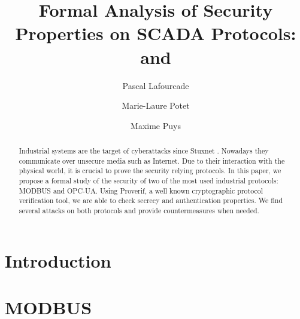\documentclass[a4paper, twocolumn]{article}
\title{Formal Analysis of Security Properties on SCADA Protocols: \opcua and \modbus}
\author{Pascal Lafourcade \and Marie-Laure Potet \and Maxime Puys}
\date{}
\newcommand{\opcua}{OPC-UA\xspace}
\newcommand{\modbus}{MODBUS\xspace}
\begin{document}
\maketitle

\begin{abstract}
    Industrial systems are the target of cyberattacks since Stuxnet
    \cite{Lan11}.  Nowadays they communicate over unsecure media such
    as Internet.  Due to their interaction with the physical world, it
    is crucial to prove the security relying protocols.  In this
    paper, we propose a formal study of the security of two of the
    most used industrial protocols: \modbus and \opcua.  Using
    Proverif, a well known cryptographic protocol verification tool,
    we are able to check secrecy and authentication properties.  We
    find several attacks on both protocols and provide countermeasures
    when needed.
\end{abstract}

\section{Introduction}


%
%
%

\section{\modbus}

\end{document}
